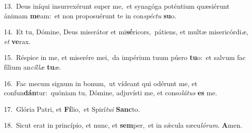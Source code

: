 {\numbfont\textcolor{\numbcolor}{13.}}~Deus iníqui insurrexérunt super me,~\dagger et synagóga poténtium quæsiérunt ánimam \textbf{me}\-am:~\star et non proposuérunt te in con\-\textit{spéc}\-\textit{tu} \textbf{su}\-o.\par
{\numbfont\textcolor{\numbcolor}{14.}}~Et tu, Dómine, Deus miserátor et mi\-\textbf{sé}\-ricors,~\star pátiens, et multæ misericórdi\-\textit{æ}\-, \textit{et} \textbf{ve}\-rax.\par
{\numbfont\textcolor{\numbcolor}{15.}}~Réspice in me, et miserére mei,~\dagger da impérium tuum púero \textbf{tu}\-o:~\star et salvum fac fílium an\-\textit{cíl}\-\textit{læ} \textbf{tu}\-æ.\par
{\numbfont\textcolor{\numbcolor}{16.}}~Fac mecum signum in bonum,~\dagger ut vídeant qui odérunt me, et confun\-\textbf{dán}\-tur:~\star quóniam tu, Dómine, adjuvísti me, et conso\-\textit{lá}\-\textit{tus} \textbf{es} me.\par
{\numbfont\textcolor{\numbcolor}{17.}}~Glória Patri, et \textbf{Fí}\-lio,~\star et Spirí\-\textit{tu}\-\textit{i} \textbf{Sanc}\-to.\par
{\numbfont\textcolor{\numbcolor}{18.}}~Sicut erat in princípio, et nunc, et \textbf{sem}\-per,~\star et in sǽcula sæcu\-\textit{ló}\-\textit{rum}. \textbf{A}\-men.\par
